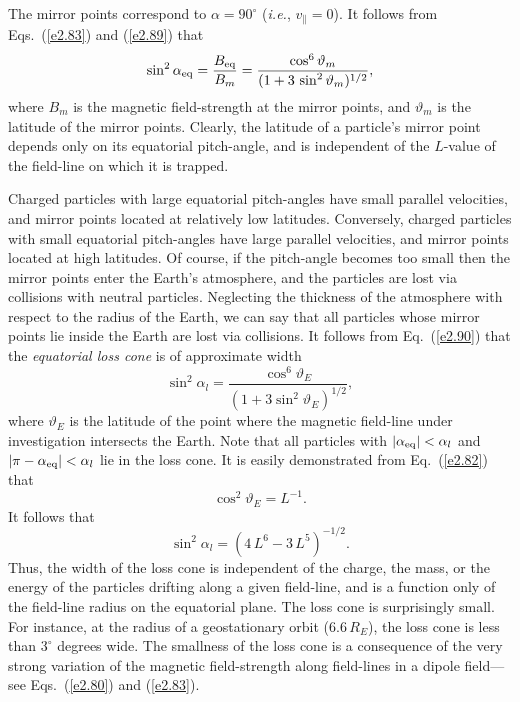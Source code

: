 The mirror points correspond to $\alpha=90^\circ$ ({\em i.e.}, $v_\parallel=0$).
It follows from Eqs.~(\ref{e2.83}) and (\ref{e2.89}) that 
\begin{equation}\label{e2.90}
\sin^2\alpha_{\rm eq} = \frac{B_{\rm eq}}{B_m} = \frac{\cos^6\vartheta_m}
{(1+3\,\sin^2\vartheta_m)^{1/2}},
\end{equation}
where $B_m$ is the magnetic field-strength at the mirror points, and $\vartheta_m$
is the latitude of the mirror points. Clearly, the latitude of a particle's
mirror point depends only on its equatorial pitch-angle, and is independent
of the $L$-value of the field-line on which it is trapped.

Charged particles with large equatorial pitch-angles have small parallel
velocities, and mirror points located at relatively low latitudes. Conversely,
charged particles with small equatorial pitch-angles have large parallel velocities,
and mirror points located at high latitudes. Of course, if the pitch-angle
becomes too small then the mirror points enter the Earth's atmosphere, and
the particles are lost via collisions with neutral particles.
Neglecting the thickness of the atmosphere with respect to
the radius of the Earth, we can say that all particles whose mirror points
lie inside the Earth are lost via collisions. It follows from
Eq.~(\ref{e2.90}) that the {\em equatorial loss cone}\/ is of approximate width
\begin{equation}
\sin^2\alpha_l = \frac{\cos^6\vartheta_E}{(1+3\sin^2\vartheta_E)^{1/2}},
\end{equation}
where $\vartheta_E$ is the latitude of the point where the magnetic field-line
under investigation intersects the Earth. 
Note that all particles with $|\alpha_{\rm eq}| < \alpha_l$ 
and $|\pi-\alpha_{\rm eq}| < \alpha_l$ lie in the
loss cone. 
It is easily demonstrated from Eq.~(\ref{e2.82}) that
\begin{equation}
\cos^2\vartheta_E = L^{-1}.
\end{equation}
It follows that
\begin{equation}
\sin^2\alpha_l = (4\,L^6 - 3\,L^5)^{-1/2}.
\end{equation}
Thus, the width of the loss cone is independent of the charge, the mass, or
the energy of the particles drifting along a given field-line, 
and is a function only of the field-line radius
on the equatorial plane. The loss cone is surprisingly small. For instance,
at the radius of a geostationary orbit ($6.6\,R_E$), the loss cone is
less than $3^\circ$ degrees wide. The smallness of the 
 loss cone is a consequence of  the very strong variation of the magnetic field-strength along field-lines in a dipole field---see Eqs.~(\ref{e2.80}) and (\ref{e2.83}). 

